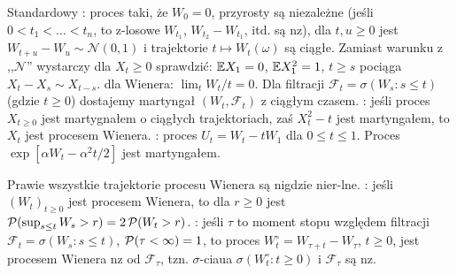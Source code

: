 Standardowy  : proces taki, że $W_0 = 0$, przyrosty są niezależne (jeśli $0 < t_1 < \dots < t_n$, to z-losowe $W_{t_1}$, $W_{t_2} - W_{t_1}$, itd. są nz), dla $t, u \ge 0$ jest $W_{t+u} - W_u \sim \mathcal N(0,1)$ i trajektorie $t \mapsto W_t(\omega)$ są ciągłe.
Zamiast warunku z ,,$\mathcal N$'' wystarczy dla $X_t \ge 0$ sprawdzić: $\mathbb{E} X_1 = 0$, $\mathbb{E} X_1^2 = 1$, $t \ge s$ pociąga $X_t - X_s \sim X_{t-s}$.
 dla Wienera: $\lim_t W_t/t = 0$.
Dla filtracji $\mathcal F_t = \sigma (W_s : s \le t)$ (gdzie $t \ge 0$) dostajemy martyngał $(W_t, \mathcal F_t)$ z ciągłym czasem.
: jeśli proces $X_{t \ge 0}$ jest martygnałem o ciągłych trajektoriach, zaś $X_t^2 - t$ jest martyngałem, to $X_t$ jest procesem Wienera.
: proces $U_t = W_t - tW_1$ dla $0 \le t \le 1$.
Proces $\exp [\alpha W_t - \alpha^2 t/2]$ jest martyngałem.

Prawie  wszystkie trajektorie procesu Wienera są nigdzie nier-lne.
: jeśli $(W_t)_{t \ge 0}$ jest procesem Wienera, to dla $r \ge 0$ jest $\operatorname{\mathcal{P}} (\sup_{s \le t} W_s > r) = 2 \operatorname{\mathcal{P}} (W_t > r)$.
: jeśli $\tau$ to moment stopu względem filtracji $\mathcal F_t = \sigma(W_s : s \le t)$, $\operatorname{\mathcal{P}} (\tau < \infty) = 1$, to proces $W_t^\circ = W_{\tau+t} - W_\tau$, $t \ge 0$, jest procesem Wienera nz od $\mathcal F_\tau$, tzn. $\sigma$-ciaua $\sigma(W_t^\circ : t \ge 0)$ i $\mathcal F_\tau$ są nz.
